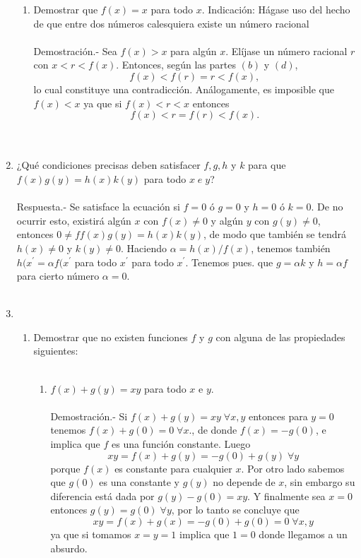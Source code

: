\begin{enumerate}[\bfseries 1.]
\begin{enumerate}[\bfseries (a)]
	    \item Demostrar que $f(x)=x$ para todo $x$. Indicación: Hágase uso del hecho de que entre dos números calesquiera existe un número racional\\\\
		Demostración.-\; Sea $f(x)>x$ para algún $x$. Elíjase un número racional $r$ con $x<r<f(x)$. Entonces, según las partes $(b)$ y $(d)$, $$f(x)<f(r)=r<f(x),$$ 
		lo cual constituye una contradicción. Análogamente, es imposible que $f(x)<x$ ya que si $f(x)<r<x$ entonces $$f(x)<r=f(r)<f(x).$$\\\\

	\end{enumerate}

	\item  ¿Qué condiciones precisas deben satisfacer $f,g,h$ y $k$ para que $f(x)g(y)=h(x)k(y)$ para todo $x \; e \; y$? \\\\
	    Respuesta.-\; Se satisface la ecuación si $f=0$ ó $g=0$ y $h=0$ ó $k=0$. De no ocurrir esto, existirá algún $x$ con $f(x)\neq 0$ y algún $y$ con $g(y)\neq 0$, entonces $0 \neq ff(x)g(y) = h(x)k(y)$, de modo que también se tendrá $h(x) \neq 0$ y $k(y)\neq 0$. Haciendo $\alpha = h(x)/f(x)$, tenemos también $h(x^{'} = \alpha f(x^{'}$ para todo $x^{'}$ para todo $x^{'}$. Tenemos pues. que $g=\alpha k$ y $h=\alpha f$ para cierto número $\alpha=0$. \\\\
	
	\item 

	\begin{enumerate}[\bfseries (a)]

	    \item Demostrar que no existen funciones $f$ y $g$ con alguna de las propiedades siguientes:\\\\

	    \begin{enumerate}[\bfseries (i)]

		\item $f(x)+g(y)=xy$ para todo $x$ e $y$.\\\\
		    Demostración.-\; Si $f(x)+g(y)=xy \; \forall x,y$ entonces para $y=0$ tenemos $f(x)+g(0)=0 \; \forall x.$, de donde $f(x)=-g(0)$, e implica que $f$ es una función constante. Luego $$xy=f(x)+g(y)=-g(0) +g(y)  \; \forall y$$ porque $f(x)$ es constante para cualquier $x$. Por otro lado sabemos que  $g(0)$ es una constante y $g(y)$  no depende de $x$, sin embargo su diferencia está dada por $g(y) - g(0) = xy$. Y finalmente sea $x=0$ entonces $g(y)=g(0) \; \forall y$,  por lo tanto se concluye que $$xy=f(x)+g(x) = -g(0) + g(0) = 0 \; \forall x,y$$  ya que si tomamos $x=y=1$ implica que $1=0$ donde llegamos a un absurdo.\\\\  


\end{enumerate}
\end{enumerate}
\end{enumerate}
